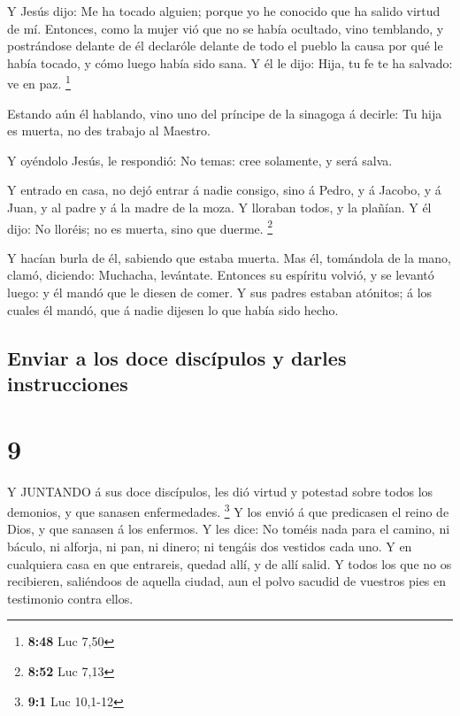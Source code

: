  Y Jesús dijo: Me ha tocado alguien; porque yo he conocido
que ha salido virtud de mí.  Entonces, como la mujer vió
que no se había ocultado, vino temblando, y postrándose delante de él
declaróle delante de todo el pueblo la causa por qué le había tocado, y
cómo luego había sido sana.  Y él le dijo: Hija, tu fe te
ha salvado: ve en paz. \footnote{\textbf{8:48} Luc 7,50}

 Estando aún él hablando, vino uno del príncipe de la
sinagoga á decirle: Tu hija es muerta, no des trabajo al Maestro.

 Y oyéndolo Jesús, le respondió: No temas: cree solamente,
y será salva.

 Y entrado en casa, no dejó entrar á nadie consigo, sino á
Pedro, y á Jacobo, y á Juan, y al padre y á la madre de la moza.
 Y lloraban todos, y la plañían. Y él dijo: No lloréis; no
es muerta, sino que duerme. \footnote{\textbf{8:52} Luc 7,13}

 Y hacían burla de él, sabiendo que estaba muerta.
 Mas él, tomándola de la mano, clamó, diciendo: Muchacha,
levántate.  Entonces su espíritu volvió, y se levantó
luego: y él mandó que le diesen de comer.  Y sus padres
estaban atónitos; á los cuales él mandó, que á nadie dijesen lo que
había sido hecho.

\hypertarget{enviar-a-los-doce-discuxedpulos-y-darles-instrucciones}{%
\subsection{Enviar a los doce discípulos y darles
instrucciones}\label{enviar-a-los-doce-discuxedpulos-y-darles-instrucciones}}

\hypertarget{section-8}{%
\section{9}\label{section-8}}

 Y JUNTANDO á sus doce discípulos, les dió virtud y potestad
sobre todos los demonios, y que sanasen enfermedades. \footnote{\textbf{9:1}
  Luc 10,1-12}  Y los envió á que predicasen el reino de
Dios, y que sanasen á los enfermos.  Y les dice: No toméis
nada para el camino, ni báculo, ni alforja, ni pan, ni dinero; ni
tengáis dos vestidos cada uno.  Y en cualquiera casa en que
entrareis, quedad allí, y de allí salid.  Y todos los que no
os recibieren, saliéndoos de aquella ciudad, aun el polvo sacudid de
vuestros pies en testimonio contra ellos.


